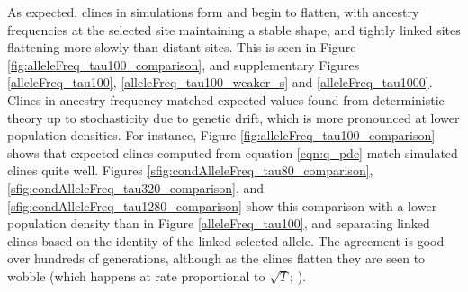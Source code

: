 \documentclass[11pt,letterpaper]{article}
\newcommand{\plr}[1]{{\em \color{blue} #1}}
\newcommand{\yb}[1]{{\em \color{magenta} #1}}
\begin{document}
As expected, clines in simulations form and begin to flatten, 
with ancestry frequencies at the selected site maintaining a stable shape,
and tightly linked sites flattening more slowly than distant sites.
This is seen in Figure \ref{fig:alleleFreq_tau100_comparison},
and supplementary Figures \ref{alleleFreq_tau100}, \ref{alleleFreq_tau100_weaker_s} and \ref{alleleFreq_tau1000}. 
Clines in ancestry frequency matched expected values found from deterministic theory
up to stochasticity due to genetic drift, which is more pronounced at lower population densities.
For instance, Figure \ref{fig:alleleFreq_tau100_comparison} shows that expected clines computed from equation \eqref{eqn:q_pde}
match simulated clines quite well.
Figures \ref{sfig:condAlleleFreq_tau80_comparison}, \ref{sfig:condAlleleFreq_tau320_comparison}, and \ref{sfig:condAlleleFreq_tau1280_comparison}
show this comparison with a lower population density than in Figure \ref{alleleFreq_tau100},
and separating linked clines based on the identity of the linked selected allele.
The agreement is good over hundreds of generations, 
although as the clines flatten they are seen to wobble
(which happens at rate proportional to $\sqrt{T}$; \citet{Barton1979a}).
\end{document}
